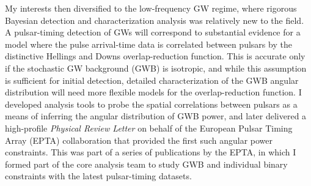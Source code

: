 \documentclass[11pt,letterpaper,sans]{moderncv} %
\begin{document}
My interests then diversified to the low-frequency GW regime, where rigorous Bayesian detection and characterization analysis was relatively new to the field. A pulsar-timing detection of GWs will correspond to substantial evidence for a model where the pulse arrival-time data is correlated between pulsars by the distinctive Hellings and Downs overlap-reduction function. This is accurate only if the stochastic GW background (GWB) is isotropic, and while this assumption is sufficient for initial detection, detailed characterization of the GWB angular distribution will need more flexible models for the overlap-reduction function. I developed analysis tools to probe the spatial correlations between pulsars as a means of inferring the angular distribution of GWB power, and later delivered a high-profile \textit{Physical Review Letter} on behalf of the European Pulsar Timing Array (EPTA) collaboration that provided the first such angular power constraints. This was part of a series of publications by the EPTA, in which I formed part of the core analysis team to study GWB and individual binary constraints with the latest pulsar-timing datasets.
\vspace{1mm}
\end{document}

